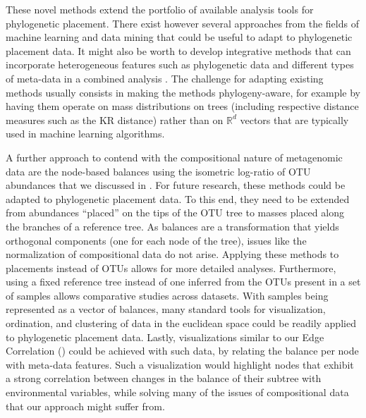 These novel methods extend the portfolio of available analysis tools for phylogenetic placement.
There exist however several approaches from the fields of machine learning and data mining
that could be useful to adapt to phylogenetic placement data.
It might also be worth to develop integrative methods that can incorporate heterogeneous features
such as phylogenetic data and different types of meta-data in a combined analysis \cite{Mariette2018}.
The challenge for adapting existing methods usually consists in making the methods phylogeny-aware,
for example by having them operate on mass distributions on trees
(including respective distance measures such as the KR distance) rather than on $\mathbb{R}^d$ vectors
that are typically used in machine learning algorithms.


A further approach to contend with the compositional nature of metagenomic data are
the node-based balances using the isometric log-ratio of OTU abundances \cite{Silverman2017,Washburne2017a}
that we discussed in .
For future research, these methods could be adapted to phylogenetic placement data.
To this end, they need to be extended from abundances ``placed'' on the tips of the OTU tree
to masses placed along the branches of a reference tree.
As balances are a transformation that yields orthogonal components (one for each node of the tree),
issues like the normalization of compositional data do not arise.
Applying these methods to placements instead of OTUs allows for more detailed analyses.
Furthermore, using a fixed reference tree instead of one inferred from the OTUs present in a set of samples
allows comparative studies across datasets.
With samples being represented as a vector of balances,
many standard tools for visualization, ordination, and clustering of data in the euclidean space
could be readily applied to phylogenetic placement data.
Lastly, visualizations similar to our Edge Correlation ()
could be achieved with such data, by relating the balance per node with meta-data features.
Such a visualization would highlight nodes that exhibit a strong correlation
between changes in the balance of their subtree with environmental variables,
while solving many of the issues of compositional data that our approach might suffer from.

